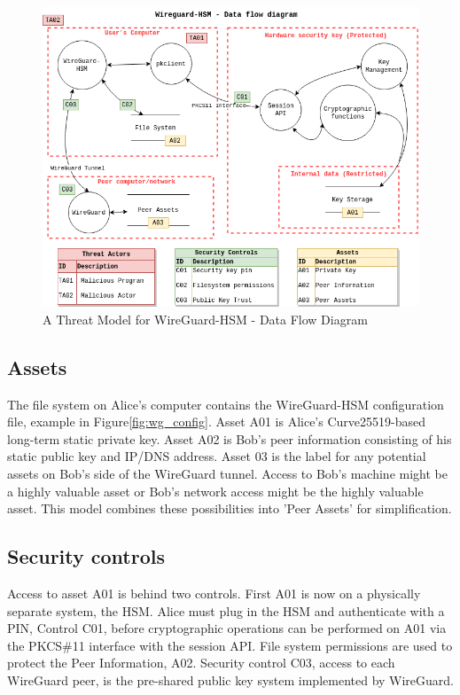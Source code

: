 \documentclass [11pt, proquest] {uwthesis}[2020/02/24]
\begin{document}
\begin{figure}[H]
\includegraphics[width=14cm]{paper/images/WGHSM_DFD.png}
\caption{A Threat Model for WireGuard-HSM - Data Flow Diagram}
\label{fig:wg_hsm_dfd}
\end{figure}

\subsection{Assets}
The file system on Alice's computer contains the WireGuard-HSM configuration file, example in Figure\ref{fig:wg_config}. 
Asset A01 is Alice's Curve25519-based long-term static private key. Asset A02 is Bob's peer information consisting of his static public key and IP/DNS address.
Asset 03 is the label for any potential assets on Bob's side of the WireGuard tunnel. Access to Bob's machine might be a highly valuable asset or Bob's network access might be the highly valuable asset. This model combines these possibilities into 'Peer Assets' for simplification.

\subsection{Security controls}
Access to asset A01 is behind two controls. First A01 is now on a physically separate system, the HSM. Alice must plug in the HSM and authenticate with a PIN, Control C01, before cryptographic operations can be performed on A01 via the PKCS\#11 interface with the session API.
File system permissions are used to protect the Peer Information, A02.
Security control C03, access to each WireGuard peer, is the pre-shared public key system implemented by WireGuard.
\end{document}
